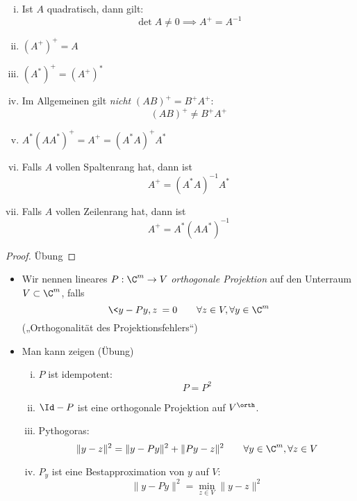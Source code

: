 \documentclass[11pt]{scrartcl}
\begin{document}
\begin{st}[Eigenschaften]
	\label{1.41}
	\begin{enumerate}[i)]
		\item
			Ist $A$ quadratisch, dann gilt:
			\[
				\det A \neq 0 \implies A^+ = A^{-1}
			\]
		\item
			$(A^+)^+ = A$
		\item
			$(A^*)^+ = (A^+)^*$
		\item
			Im Allgemeinen gilt \emph{nicht} $(AB)^+ = B^+A^+$:
			\[
				(AB)^+ \neq B^+A^+
			\]
		\item
			$A^*(AA^*)^+ = A^+ = (A^*A)^+ A^*$
		\item
			Falls $A$ vollen Spaltenrang hat, dann ist
			\[
				A^+ = (A^*A)^{-1}A^*
			\]
		\item
			Falls $A$ vollen Zeilenrang hat, dann ist
			\[
				A^+ = A^*(AA^*)^{-1}
			\]
	\end{enumerate}
	\begin{proof}
		Übung
	\end{proof}
\end{st}

\begin{nt*}
	\begin{itemize}
		\item
			Wir nennen lineares $P: \C^m \to V$ \emph{orthogonale Projektion} auf den Unterraum $V\subset \C^m$, falls
			\[
				\<y- Py,z\> = 0 \qquad \forall z\in V, \forall y\in \C^m
			\]
			(„Orthogonalität des Projektionsfehlers“)
		\item
			Man kann zeigen (Übung)
			\begin{enumerate}[i)]
				\item
					$P$ ist idempotent:
					\[
						P = P^2
					\]
				\item
					$\Id - P$ ist eine orthogonale Projektion auf $V^\orth$.
				\item
					Pythogoras:
					\[
						\|y-z\|^2 = \|y-Py\|^2 + \|Py-z\|^2 
						\qquad \forall y\in \C^m,\forall z\in V
					\]
				\item
					$P_y$ ist eine Bestapproximation von $y$ auf $V$:
					\[
						\|y-Py\|^2 = \min_{z\in V}\|y-z\|^2
					\]
			\end{enumerate}
	\end{itemize}
\end{nt*}
\end{document}
